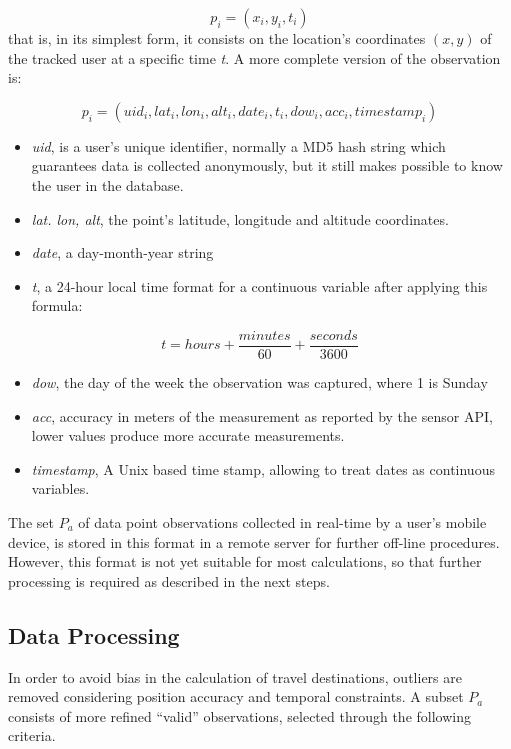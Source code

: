 \documentclass[runningheads]{llncs}
\begin{document}
\[ p_i = (x_i, y_i, t_i) \]
that is, in its simplest form, it consists on the location's coordinates \((x,y)\) of the tracked user at a specific time \emph{t}. A more complete version of the observation is:

\[ p_i  = (uid_i, lat_i, lon_i, alt_i, date_i, t_i, dow_i, acc_i, timestamp_i) \]

\begin{itemize}
\item
  \emph{uid}, is a user's unique identifier, normally a MD5 hash string which guarantees data is collected anonymously, but it still makes possible to know the user in the database.
\item
  \emph{lat. lon, alt}, the point's latitude, longitude and altitude coordinates.
\item
  \emph{date}, a day-month-year string
\item
  \emph{t}, a 24-hour local time format for a continuous variable after applying this formula:
\end{itemize}

\begin{equation} 
  t  =  hours + \frac{minutes}{60} + \frac{seconds}{3600} 
\end{equation}

\begin{itemize}
\item
  \emph{dow}, the day of the week the observation was captured, where 1 is Sunday
\item
  \emph{acc}, accuracy in meters of the measurement as reported by the sensor API, lower values produce more accurate measurements.
\item
  \emph{timestamp}, A Unix based time stamp, allowing to treat dates as continuous variables.
\end{itemize}

The set \(P_a\) of data point observations collected in real-time by a user's mobile device, is stored in this format in a remote server for further off-line procedures. However, this format is not yet suitable for most calculations, so that further processing is required as described in the next steps.

\hypertarget{data-processing}{%
\subsection{Data Processing}\label{data-processing}}

In order to avoid bias in the calculation of travel destinations, outliers are removed considering position accuracy and temporal constraints. A subset \(P_a\) consists of more refined ``valid'' observations, selected through the following criteria.
\end{document}

